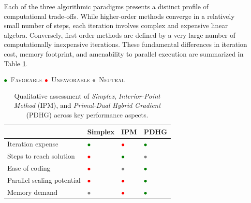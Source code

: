 \documentclass[twoside,12pt,openright]{report}  %
\begin{document}

Each of the three algorithmic paradigms presents a distinct profile of computational trade-offs. While higher-order methods converge in a relatively small number of steps, each iteration involves complex and expensive linear algebra. Conversely, first-order methods are defined by a very large number of computationally inexpensive iterations. These fundamental differences in iteration cost, memory footprint, and amenability to parallel execution are summarized in Table \ref{tab:methods}.
\newcommand{\good}{\textcolor{green}{\large$\bullet$}}
\newcommand{\ok}{\textcolor{gray}{\large$\bullet$}}
\newcommand{\bad}{\textcolor{red}{\large$\bullet$}}
\renewcommand{\arraystretch}{1.4}
\begin{table}[h]
\centering
\renewcommand{\arraystretch}{1.4}

\small
\good~\textsc{Favorable} \quad
\bad~\textsc{Unfavorable} \quad
\ok~\textsc{Neutral} \\
\vspace{0.5em}

\begin{tabular}{>{\raggedright\arraybackslash}p{5cm}|
                >{\centering\arraybackslash}m{2cm}|
                >{\centering\arraybackslash}m{2cm}|
                >{\centering\arraybackslash}m{2cm}}
\hline
 & \textbf{Simplex} & \textbf{IPM} & \textbf{PDHG} \\
\hline
Iteration expense & \good & \bad & \good \\
Steps to reach solution & \bad & \good & \ok \\
Ease of coding & \bad & \ok & \good \\
Parallel scaling potential & \bad & \bad & \good \\
Memory demand & \ok & \bad & \good \\
\hline
\end{tabular}

\caption{Qualitative assessment of \textit{Simplex}, \textit{Interior-Point Method} (IPM), and \textit{Primal-Dual Hybrid Gradient} (PDHG) across key performance aspects.}
\label{tab:methods}
\end{table}
\vspace{-0.75cm}
\end{document}
